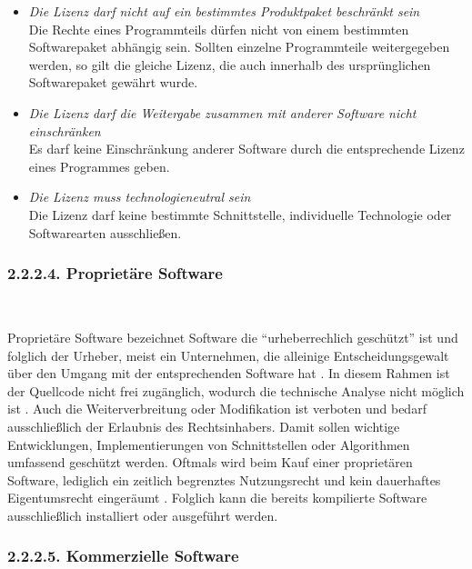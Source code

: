 \begin{itemize}
    \item \textit{Die Lizenz darf nicht auf ein bestimmtes Produktpaket beschränkt sein}\\
    Die Rechte eines Programmteils dürfen nicht von einem bestimmten Softwarepaket abhängig sein. Sollten einzelne Programmteile weitergegeben werden, so gilt die gleiche Lizenz, die auch innerhalb des ursprünglichen Softwarepaket gewährt wurde.

    \item \textit{Die Lizenz darf die Weitergabe zusammen mit anderer Software nicht einschränken}\\
    Es darf keine Einschränkung anderer Software durch die entsprechende Lizenz eines Programmes geben.

    \item \textit{Die Lizenz muss technologieneutral sein}\\
    Die Lizenz darf keine bestimmte Schnittstelle, individuelle Technologie oder Softwarearten ausschließen. 

\end{itemize}

\subsubsection{2.2.2.4. Proprietäre Software}$~$

Proprietäre Software bezeichnet Software die "`urheberrechlich geschützt"' ist und folglich der Urheber, meist ein Unternehmen, die alleinige Entscheidungsgewalt über den Umgang mit der entsprechenden Software hat \cite[S. 26]{groll_1x1_2021}. In diesem Rahmen ist der Quellcode nicht frei zugänglich, wodurch die technische Analyse nicht möglich ist \cite[S. 15]{wilmer_rechtliche_2021}. Auch die Weiterverbreitung oder Modifikation ist verboten und bedarf ausschließlich der Erlaubnis des Rechtsinhabers. Damit sollen wichtige Entwicklungen, Implementierungen von Schnittstellen oder Algorithmen umfassend geschützt werden. Oftmals wird beim Kauf einer proprietären Software, lediglich ein zeitlich begrenztes Nutzungsrecht und kein dauerhaftes Eigentumsrecht eingeräumt \cite[S. 15]{wilmer_rechtliche_2021}. Folglich kann die bereits kompilierte Software ausschließlich installiert oder ausgeführt werden. 

\subsubsection{2.2.2.5. Kommerzielle Software}$~$

